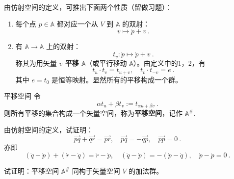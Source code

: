 由仿射空间的定义，可推出下面两个性质（留做习题）：
\begin{enumerate}
\item 每个点 $\dot p\in \mathbb A$ 都对应一个从 $V$ 到 $\mathbb A$ 的双射：
\begin{equation}\label{eq_AfSp_4}
v\mapsto \dot p+v~.
\end{equation}


\item 有 $\mathbb A\rightarrow\mathbb A$ 上的双射：
\begin{equation}\label{eq_AfSp_3}
t_v:\dot p\mapsto\dot p+v~.
\end{equation}
 称其为用矢量 \textbf{$v$ 平移 $\mathbb A$}（或平行移动 $\mathbb A$）。由定义中的1，2，有
 \begin{equation}
 t_u\cdot t_v=t_{u+v},\quad t_v\cdot t_{-v}=e~.
 \end{equation}
  其中 $e=t_0$ 是恒等映射。显然所有的平移构成一个群。
\end{enumerate}
\begin{definition}{平移空间}
令
\begin{equation}
\alpha t_u+\beta t_v:= t_{\alpha u+\beta v}~.
\end{equation}
则所有平移的集合构成一个矢量空间，称为\textbf{平移空间}，记作 $\mathbb A^{\#}$.
\end{definition}
\begin{example}{}
由仿射空间的定义，试证明：
\begin{equation}
\overrightarrow{pq}+\overrightarrow{qr}=\overrightarrow{pr},\quad \overrightarrow{pq}=-\overrightarrow{qp},\quad\overrightarrow{pp}=0~.
\end{equation}
亦即
\begin{equation}
(\dot q-\dot p )+(\dot r-\dot q)=\dot r-\dot p,\quad(\dot q-\dot p)=-(\dot p-\dot q),\quad\dot p-\dot p=0~.
\end{equation}
\end{example}

\begin{exercise}{}\label{exe_AfSp_1}
试证明：平移空间 $\mathbb A^{\#}$ 同构于矢量空间 $V$ 的加法群。
\end{exercise}
